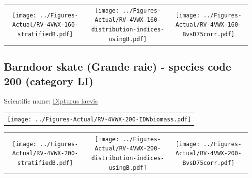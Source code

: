 \documentclass[12pt]{article}\usepackage[]{graphicx}\usepackage[]{color}
\begin{document}
\vspace{1cm}
\begin{minipage}{1.0\textwidth}
 \begin{tabular}{ccc}
\texttt{[image: ../Figures-Actual/RV-4VWX-160-stratifiedB.pdf]} & 
\texttt{[image: ../Figures-Actual/RV-4VWX-160-distribution-indices-usingB.pdf]} & 
\texttt{[image: ../Figures-Actual/RV-4VWX-160-BvsD75corr.pdf]} \\ 
\end{tabular} 
\end{minipage}
\clearpage

\renewcommand\thefigure{\thesubsection\Alph{figure}}

\setcounter{figure}{0}

\hypertarget{sec:200}{%
\subsection{Barndoor skate (Grande raie) - species code 200 (category LI)}\label{sec:200}}

  


Scientific name: \href{http://www.marinespecies.org/aphia.php?p=taxdetails\&id=158548}{Dipturus laevis} \newline
\begin{minipage}{1.0\textwidth}
 \begin{tabular}{c}
\texttt{[image: ../Figures-Actual/RV-4VWX-200-IDWbiomass.pdf]} \\ 
\end{tabular} 
\end{minipage}
\newline

\vspace{1cm}
\begin{minipage}{1.0\textwidth}
 \begin{tabular}{ccc}
\texttt{[image: ../Figures-Actual/RV-4VWX-200-stratifiedB.pdf]} & 
\texttt{[image: ../Figures-Actual/RV-4VWX-200-distribution-indices-usingB.pdf]} & 
\texttt{[image: ../Figures-Actual/RV-4VWX-200-BvsD75corr.pdf]} \\ 
\end{tabular} 
\end{minipage}
\clearpage
\end{document}
